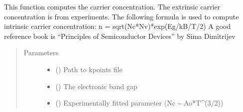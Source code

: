 \documentclass[letterpaper,10pt,english]{sphinxmanual}
\begin{document}
\begin{fulllineitems}
\label{\detokenize{autosummary/ThermoElectric.carrier_concentration:ThermoElectric.carrier_concentration}}
\sphinxAtStartPar
This function computes the carrier concentration. The extrinsic carrier concentration is from experiments.
The following formula is used to compute intrinsic carrier concentration: n = sqrt(Nc*Nv)*exp(\sphinxhyphen{}Eg/kB/T/2)
A good reference book is “Principles of Semiconductor Devices” by Sima Dimitrijev
\begin{quote}\begin{description}
\item[{Parameters}] \leavevmode\begin{itemize}
\item {} 
\sphinxAtStartPar
{} () \textendash{} Path to kpoints file

\item {} 
\sphinxAtStartPar
{} () \textendash{} The electronic band gap

\item {} 
\sphinxAtStartPar
{} () \textendash{} Experimentally fitted parameter (Nc \textasciitilde{} Ao*T\textasciicircum{}(3/2))


\end{itemize}
\end{description}
\end{quote}
\end{fulllineitems}
\end{document}
